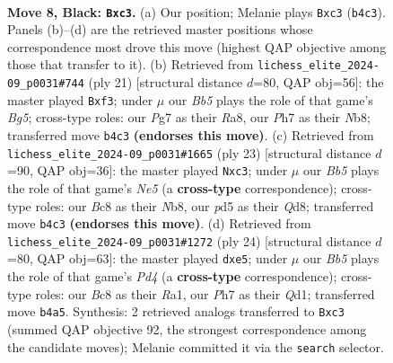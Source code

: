 \documentclass[11pt]{article}
\begin{document}
\begin{figure}[p]\centering
\begin{subfigure}{0.46\textwidth}\centering
\resizebox{\linewidth}{!}{%
\newchessgame
\chessboard[
  setfen={rnbq1rk1/pp3ppp/4p3/2pP3n/1b1P4/2NBPN2/PP3PPP/R1BQ1RK1 b - - 0 8},
  showmover=false,
  pgfstyle=straightmove, color=movearrow, markmove={b4-c3}
]}
\caption{}
\end{subfigure}\hfill
\begin{subfigure}{0.46\textwidth}\centering
\resizebox{\linewidth}{!}{%
\newchessgame
\chessboard[
  setfen={rn1q1rk1/1p2ppbp/2p3p1/p1nP4/6b1/1PN1PN2/PB1PBPPP/R1Q1R1K1 b - - 0 11},
  showmover=false,
  pgfstyle=straightmove, color=movearrow, markmove={g4-f3}
]}
\caption{}
\end{subfigure}
\\[4pt]
\begin{subfigure}{0.46\textwidth}\centering
\resizebox{\linewidth}{!}{%
\newchessgame
\chessboard[
  setfen={rn1q1rk1/1pp2ppp/p1b1p3/4P3/1b1Pn3/2N2NP1/PPQ2PBP/R1B2RK1 b - - 2 12},
  showmover=false,
  pgfstyle=straightmove, color=movearrow, markmove={e4-c3}
]}
\caption{}
\end{subfigure}\hfill
\begin{subfigure}{0.46\textwidth}\centering
\resizebox{\linewidth}{!}{%
\newchessgame
\chessboard[
  setfen={r2qr1k1/pb2bppp/1pp2n2/3pn3/3PPB2/2N3P1/PP3PBP/R2QR1K1 w - - 0 13},
  showmover=false,
  pgfstyle=straightmove, color=movearrow, markmove={d4-e5}
]}
\caption{}
\end{subfigure}
\caption{\textbf{Move 8, Black: \texttt{Bxc3}.} (a) Our position; Melanie plays \texttt{Bxc3} (\texttt{b4c3}). Panels (b)--(d) are the retrieved master positions whose correspondence most drove this move (highest QAP objective among those that transfer to it). (b) Retrieved from \texttt{lichess\_elite\_2024-09\_p0031\#744} (ply 21) [structural distance $d$=80, QAP obj=56]: the master played \texttt{Bxf3}; under $\mu$ our \emph{Bb5} plays the role of that game's \emph{Bg5}; cross-type roles: our \emph{P}g7 as their \emph{R}a8, our \emph{P}h7 as their \emph{N}b8; transferred move \texttt{b4c3} \textbf{(endorses this move)}. (c) Retrieved from \texttt{lichess\_elite\_2024-09\_p0031\#1665} (ply 23) [structural distance $d$=90, QAP obj=36]: the master played \texttt{Nxc3}; under $\mu$ our \emph{Bb5} plays the role of that game's \emph{Ne5} (a \textbf{cross-type} correspondence); cross-type roles: our \emph{B}c8 as their \emph{N}b8, our \emph{p}d5 as their \emph{Q}d8; transferred move \texttt{b4c3} \textbf{(endorses this move)}. (d) Retrieved from \texttt{lichess\_elite\_2024-09\_p0031\#1272} (ply 24) [structural distance $d$=80, QAP obj=63]: the master played \texttt{dxe5}; under $\mu$ our \emph{Bb5} plays the role of that game's \emph{Pd4} (a \textbf{cross-type} correspondence); cross-type roles: our \emph{B}c8 as their \emph{R}a1, our \emph{P}h7 as their \emph{Q}d1; transferred move \texttt{b4a5}. Synthesis: 2 retrieved analogs transferred to \texttt{Bxc3} (summed QAP objective 92, the strongest correspondence among the candidate moves); Melanie committed it via the \texttt{search} selector.}
\label{fig:thought-m15}
\end{figure}
\end{document}
